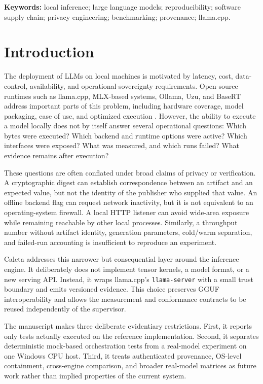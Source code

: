 \documentclass[11pt,a4paper]{article}
\begin{document}
\noindent\textbf{Keywords:} local inference; large language models; reproducibility; software supply chain; privacy engineering; benchmarking; provenance; llama.cpp.

\clearpage
\section{Introduction}

The deployment of LLMs on local machines is motivated by latency, cost, data-control, availability, and operational-sovereignty requirements. Open-source runtimes such as llama.cpp, MLX-based systems, Ollama, Uzu, and BaseRT address important parts of this problem, including hardware coverage, model packaging, ease of use, and optimized execution \cite{llamacpp,mlx,ollama,uzu,basert}. However, the ability to execute a model locally does not by itself answer several operational questions: Which bytes were executed? Which backend and runtime options were active? Which interfaces were exposed? What was measured, and which runs failed? What evidence remains after execution?

These questions are often conflated under broad claims of privacy or verification. A cryptographic digest can establish correspondence between an artifact and an expected value, but not the identity of the publisher who supplied that value. An offline backend flag can request network inactivity, but it is not equivalent to an operating-system firewall. A local HTTP listener can avoid wide-area exposure while remaining reachable by other local processes. Similarly, a throughput number without artifact identity, generation parameters, cold/warm separation, and failed-run accounting is insufficient to reproduce an experiment.

Caleta addresses this narrower but consequential layer around the inference engine. It deliberately does not implement tensor kernels, a model format, or a new serving API. Instead, it wraps llama.cpp's \texttt{llama-server} with a small trust boundary and emits versioned evidence. This choice preserves GGUF interoperability \cite{gguf} and allows the measurement and conformance contracts to be reused independently of the supervisor.

The manuscript makes three deliberate evidentiary restrictions. First, it reports only tests actually executed on the reference implementation. Second, it separates deterministic mock-based orchestration tests from a real-model experiment on one Windows CPU host. Third, it treats authenticated provenance, OS-level containment, cross-engine comparison, and broader real-model matrices as future work rather than implied properties of the current system.
\end{document}

